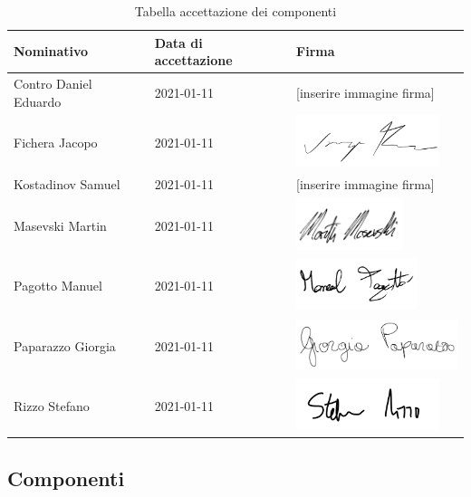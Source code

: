 \documentclass[../piano_di_progetto.tex]{subfiles}
\begin{document}
\begin{table}[!ht]
	\centering
	\begin{tabular}{|l|l|l|}
		\hline
		\rowcolor{lightgray}
		\textbf{Nominativo} & \textbf{Data di accettazione} & \textbf{Firma} \\ 
		\hline
		Contro Daniel Eduardo & 2021-01-11 & [inserire immagine firma] \\ 
		\hline
		Fichera Jacopo & 2021-01-11 & \includegraphics[height=1.5cm]{img/firma_jf} \\ 
		\hline
		Kostadinov Samuel & 2021-01-11 & [inserire immagine firma] \\
		\hline
		Masevski Martin & 2021-01-11 & \includegraphics[height=1.5cm]{img/firma_mm} \\ 
		\hline
		Pagotto Manuel & 2021-01-11 & \includegraphics[height=1.5cm]{img/firma_mp}  \\ 
		\hline
		Paparazzo Giorgia & 2021-01-11 & \includegraphics[height=1.5cm]{img/firma_gp} \\
		\hline
		Rizzo Stefano & 2021-01-11 & \includegraphics[height=1.5cm]{img/firma_sr}  \\ 
		\hline

	\end{tabular}
		\caption{Tabella accettazione dei componenti}
\end{table}

\newpage

\subsection{Componenti}%
\label{sub:comp}
\end{document}
